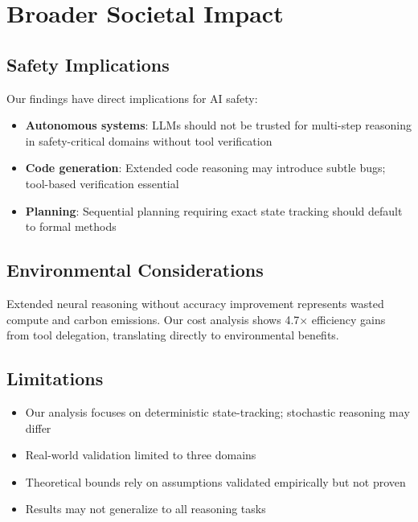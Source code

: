 \documentclass{article}
\theoremstyle{plain}
\theoremstyle{definition}
\theoremstyle{remark}
\begin{document}

\section{Broader Societal Impact}
\label{app:impact}

\subsection{Safety Implications}

Our findings have direct implications for AI safety:
\begin{itemize}
\item \textbf{Autonomous systems}: LLMs should not be trusted for multi-step reasoning in safety-critical domains without tool verification
\item \textbf{Code generation}: Extended code reasoning may introduce subtle bugs; tool-based verification essential
\item \textbf{Planning}: Sequential planning requiring exact state tracking should default to formal methods
\end{itemize}

\subsection{Environmental Considerations}

Extended neural reasoning without accuracy improvement represents wasted compute and carbon emissions. Our cost analysis shows 4.7$\times$ efficiency gains from tool delegation, translating directly to environmental benefits.

\subsection{Limitations}

\begin{itemize}
\item Our analysis focuses on deterministic state-tracking; stochastic reasoning may differ
\item Real-world validation limited to three domains
\item Theoretical bounds rely on assumptions validated empirically but not proven
\item Results may not generalize to all reasoning tasks
\end{itemize}
\end{document}
